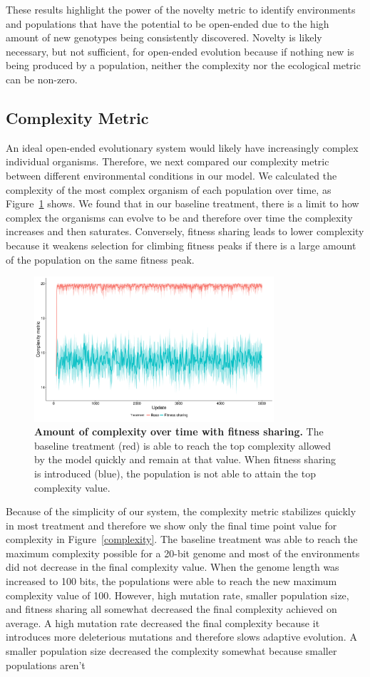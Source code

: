 \documentclass[letterpaper]{article}
\begin{document}
These results highlight the power of the novelty metric to identify environments and populations that have the potential to be open-ended due to the high amount of new genotypes being consistently discovered. Novelty is likely necessary, but not sufficient, for open-ended evolution because if nothing new is being produced by a population, neither the complexity nor the ecological metric can be non-zero.

\subsection{Complexity Metric}
    An ideal open-ended evolutionary system would likely have increasingly complex individual organisms. Therefore, we next compared our complexity metric between different environmental conditions in our model. We calculated the complexity of the most complex organism of each population over time, as Figure~\ref{complexity_time} shows. We found that in our baseline treatment, there is a limit to how complex the organisms can evolve to be and therefore over time the complexity increases and then saturates. Conversely, fitness sharing leads to lower complexity because it weakens selection for climbing fitness peaks if there is a large amount of the population on the same fitness peak.

\begin{figure}
\includegraphics[width=3.5in]{figs/complexity_fitness_sharing.png}
\caption{\textbf{Amount of complexity over time with fitness sharing.} The baseline treatment (red) is able to reach the top complexity allowed by the model quickly and remain at that value. When fitness sharing is introduced (blue), the population is not able to attain the top complexity value.}
\label{complexity_time}
\end{figure}

Because of the simplicity of our system, the complexity metric stabilizes quickly in most treatment and therefore we show only the final time point value for complexity in Figure~\ref{complexity}. The baseline treatment was able to reach the maximum complexity possible for a 20-bit genome and most of the environments did not decrease in the final complexity value. When the genome length was increased to 100 bits, the populations were able to reach the new maximum complexity value of 100. However, high mutation rate, smaller population size, and fitness sharing all somewhat decreased the final complexity achieved on average. A high mutation rate decreased the final complexity because it introduces more deleterious mutations and therefore slows adaptive evolution. A smaller population size decreased the complexity somewhat because smaller populations aren't
\end{document}
